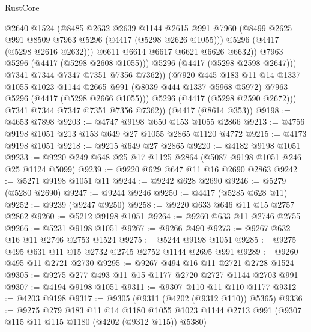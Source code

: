 \begin{lexlean}{RustCore}
\begin{coremodule}
                      @2640
                      @1524
                      (@8485
                        @2632
                        @2639
                        @1144
                        @2615
                        @991
                        @7960
                        (@8499 @2625 @991 @8509 @7963 @5296 (@4417 (@5298 @2626 @1055)))
                        @5296
                        (@4417 (@5298 @2616 @2632)))
                      @6611
                      @6614
                      @6617
                      @6621
                      @6626
                      @6632))
                  @7963
                  @5296
                  (@4417 (@5298 @2608 @1055)))
                @5296
                (@4417 (@5298 @2598 @2647)))
              @7341
              @7344
              @7347
              @7351
              @7356
              @7362))
          (@7920
            @445
            @183
            @11
            @14
            @1337
            @1055
            @1023
            @1144
            @2665
            @991
            (@8039 @444 @1337 @5968 @5972)
            @7963
            @5296
            (@4417 (@5298 @2666 @1055)))
          @5296
          (@4417 (@5298 @2590 @2672)))
        @7341
        @7344
        @7347
        @7351
        @7356
        @7362))
    (@4417 (@8614 @353))
@9198 := @4653 @7898
@9203 := @4747 @9198 @650 @153 @1055 @2866
@9213 := @4756 @9198 @1051 @213 @153 @649 @27 @1055 @2865 @1120 @4772
@9215 := @4173 @9198 @1051
@9218 := @9215 @649 @27 @2865
@9220 := @4182 @9198 @1051
@9233 := @9220 @249 @648 @25 @17 @1125 @2864 (@5087 @9198 @1051 @246 @25 @1124 @5099)
@9239 := @9220 @629 @647 @11 @16 @2690 @2863
@9242 := @5271 @9198 @1051 @11
@9244 := @9242 @628 @2690
@9246 := @5279 (@5280 @2690)
@9247 := @9244 @9246
@9250 := @4417 (@5285 @628 @11)
@9252 := @9239 (@9247 @9250)
@9258 := @9220 @633 @646 @11 @15 @2757 @2862
@9260 := @5212 @9198 @1051
@9264 := @9260 @633 @11 @2746 @2755
@9266 := @5231 @9198 @1051
@9267 := @9266 @490
@9273 := @9267 @632 @16 @11 @2746 @2753 @1524
@9275 := @5244 @9198 @1051
@9285 := @9275 @495 @631 @11 @15 @2732 @2745 @2752 @1144 @2695 @991
@9289 := @9260 @495 @11 @2721 @2730
@9295 := @9267 @494 @16 @11 @2721 @2728 @1524
@9305 := @9275 @277 @493 @11 @15 @1177 @2720 @2727 @1144 @2703 @991
@9307 := @4194 @9198 @1051
@9311 := @9307 @110 @11 @110 @1177
@9312 := @4203 @9198
@9317 := @9305 (@9311 (@4202 (@9312 @110)) @5365)
@9336 := @9275
    @279
    @183
    @11
    @14
    @1180
    @1055
    @1023
    @1144
    @2713
    @991
    (@9307 @115 @11 @115 @1180 (@4202 (@9312 @115)) @5380)

\end{coremodule}
\end{lexlean}
